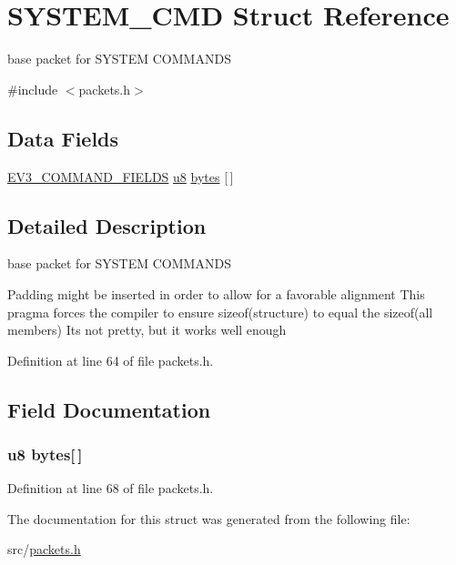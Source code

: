 \hypertarget{struct_s_y_s_t_e_m___c_m_d}{}\section{S\+Y\+S\+T\+E\+M\+\_\+\+C\+M\+D Struct Reference}
\label{struct_s_y_s_t_e_m___c_m_d}


base packet for S\+Y\+S\+T\+E\+M C\+O\+M\+M\+A\+N\+D\+S  




{\ttfamily \#include $<$packets.\+h$>$}

\subsection*{Data Fields}
\begin{DoxyCompactItemize}
\item 
\hyperlink{packets_8h_a0c26a010ef0da2962a751796943824c9}{E\+V3\+\_\+\+C\+O\+M\+M\+A\+N\+D\+\_\+\+F\+I\+E\+L\+D\+S} \hyperlink{defs_8h_a92c50087ca0e64fa93fc59402c55f8ca}{u8} \hyperlink{struct_s_y_s_t_e_m___c_m_d_a2d91cb3d17029658efa97c43e22379f0}{bytes} \mbox{[}$\,$\mbox{]}
\end{DoxyCompactItemize}


\subsection{Detailed Description}
base packet for S\+Y\+S\+T\+E\+M C\+O\+M\+M\+A\+N\+D\+S 

Padding might be inserted in order to allow for a favorable alignment This pragma forces the compiler to ensure sizeof(structure) to equal the sizeof(all members) It\textquotesingle{}s not pretty, but it works well enough 

Definition at line 64 of file packets.\+h.



\subsection{Field Documentation}
\hypertarget{struct_s_y_s_t_e_m___c_m_d_a2d91cb3d17029658efa97c43e22379f0}{}
\subsubsection[{bytes}]{ {\bf u8} bytes\mbox{[}$\,$\mbox{]}}\label{struct_s_y_s_t_e_m___c_m_d_a2d91cb3d17029658efa97c43e22379f0}


Definition at line 68 of file packets.\+h.



The documentation for this struct was generated from the following file\+:\begin{DoxyCompactItemize}
\item 
src/\hyperlink{packets_8h}{packets.\+h}\end{DoxyCompactItemize}

